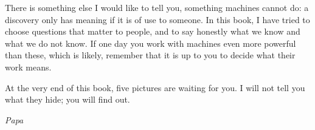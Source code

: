 \medskip
There is something else I would like to tell you, something machines cannot do: a discovery only has meaning if it is
of use to someone. In this book, I have tried to choose questions that matter to people, and to say honestly what we
know and what we do not know. If one day you work with machines even more powerful than these, which is likely,
remember that it is up to you to decide what their work means.

At the very end of this book, five pictures are waiting for you. I will not tell you what they hide; you will find out.

\bigskip
\begin{flushright}
\emph{Papa}
\end{flushright}
